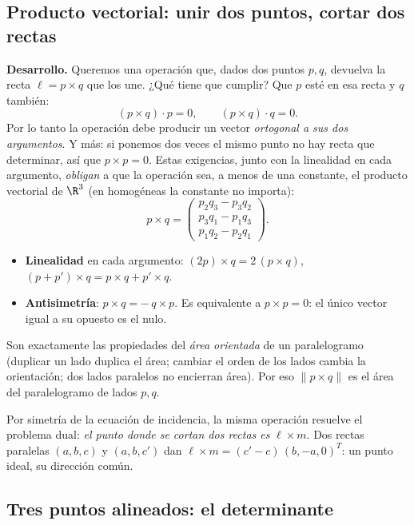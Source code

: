\subsection{Producto vectorial: unir dos puntos, cortar dos rectas}\label{sec:vectorial}

\textbf{Desarrollo.} Queremos una operación que, dados dos puntos \(p,q\), devuelva la recta
\(\ell=p\times q\) que los une. ¿Qué tiene que cumplir? Que \(p\) esté en esa recta y \(q\)
también:
\[
  (p\times q)\cdot p=0,\qquad (p\times q)\cdot q=0 .
\]
Por lo tanto la operación debe producir un vector \emph{ortogonal a sus dos argumentos}. Y
más: si ponemos dos veces el mismo punto no hay recta que determinar, así que \(p\times p=0\).
Estas exigencias, junto con la linealidad en cada argumento, \emph{obligan} a que la
operación sea, a menos de una constante, el producto vectorial de \(\R^3\) (en homogéneas
la constante no importa):
\[
  p\times q=\begin{pmatrix}p_2q_3-p_3q_2\\ p_3q_1-p_1q_3\\ p_1q_2-p_2q_1\end{pmatrix}.
\]

\begin{resultado}
\begin{itemize}
  \item \textbf{Linealidad} en cada argumento: \((2p)\times q=2\,(p\times q)\),
  \((p+p')\times q=p\times q+p'\times q\).
  \item \textbf{Antisimetría}: \(p\times q=-\,q\times p\). Es equivalente a \(p\times p=0\):
  el único vector igual a su opuesto es el nulo.
\end{itemize}
Son exactamente las propiedades del \emph{área orientada} de un paralelogramo (duplicar un
lado duplica el área; cambiar el orden de los lados cambia la orientación; dos lados
paralelos no encierran área). Por eso \(\lVert p\times q\rVert\) es el área del paralelogramo
de lados \(p,q\).
\end{resultado}

Por simetría de la ecuación de incidencia, la misma operación resuelve el problema dual:
\emph{el punto donde se cortan dos rectas es} \(\ell\times m\). Dos rectas paralelas
\((a,b,c)\) y \((a,b,c')\) dan \(\ell\times m=(c'-c)\,(b,-a,0)^T\): un punto ideal, su
dirección común.

\subsection{Tres puntos alineados: el determinante}\label{sec:determinante}


